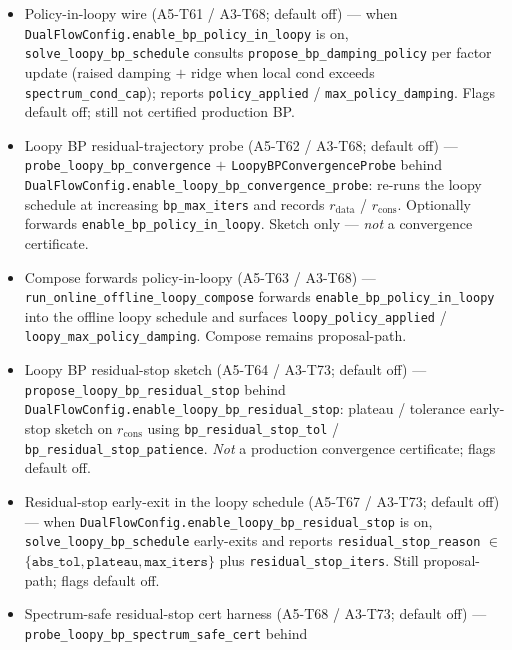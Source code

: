 \documentclass[11pt]{article}
\begin{document}
\begin{itemize}[leftmargin=1.5em]
  off) --- \texttt{run\_online\_offline\_loopy\_compose} behind
  \texttt{DualFlowConfig.enable\_online\_offline\_loopy\_compose}: live
  BMU tallies then offline loopy-BP schedule. Still proposal-path; not
  production online$\to$offline BP.
  \item Policy-in-loopy wire (A5-T61 / A3-T68; default off) --- when
  \texttt{DualFlowConfig.enable\_bp\_policy\_in\_loopy} is on,
  \texttt{solve\_loopy\_bp\_schedule} consults
  \texttt{propose\_bp\_damping\_policy} per factor update (raised damping $+$
  ridge when local cond exceeds \texttt{spectrum\_cond\_cap}); reports
  \texttt{policy\_applied} / \texttt{max\_policy\_damping}. Flags default
  off; still not certified production BP.
  \item Loopy BP residual-trajectory probe (A5-T62 / A3-T68; default off)
  --- \texttt{probe\_loopy\_bp\_convergence} $+$
  \texttt{LoopyBPConvergenceProbe} behind
  \texttt{DualFlowConfig.enable\_loopy\_bp\_convergence\_probe}: re-runs the
  loopy schedule at increasing \texttt{bp\_max\_iters} and records
  $r_{\mathrm{data}}$ / $r_{\mathrm{cons}}$. Optionally forwards
  \texttt{enable\_bp\_policy\_in\_loopy}. Sketch only --- \emph{not} a
  convergence certificate.
  \item Compose forwards policy-in-loopy (A5-T63 / A3-T68) ---
  \texttt{run\_online\_offline\_loopy\_compose} forwards
  \texttt{enable\_bp\_policy\_in\_loopy} into the offline loopy schedule and
  surfaces \texttt{loopy\_policy\_applied} /
  \texttt{loopy\_max\_policy\_damping}. Compose remains proposal-path.
  \item Loopy BP residual-stop sketch (A5-T64 / A3-T73; default off)
  --- \texttt{propose\_loopy\_bp\_residual\_stop} behind
  \texttt{DualFlowConfig.enable\_loopy\_bp\_residual\_stop}: plateau /
  tolerance early-stop sketch on $r_{\mathrm{cons}}$ using
  \texttt{bp\_residual\_stop\_tol} / \texttt{bp\_residual\_stop\_patience}.
  \emph{Not} a production convergence certificate; flags default off.
  \item Residual-stop early-exit in the loopy schedule (A5-T67 / A3-T73;
  default off) --- when
  \texttt{DualFlowConfig.enable\_loopy\_bp\_residual\_stop} is on,
  \texttt{solve\_loopy\_bp\_schedule} early-exits and reports
  \texttt{residual\_stop\_reason} $\in$
  $\{\texttt{abs\_tol},\texttt{plateau},\texttt{max\_iters}\}$ plus
  \texttt{residual\_stop\_iters}. Still proposal-path; flags default off.
  \item Spectrum-safe residual-stop cert harness (A5-T68 / A3-T73;
  default off) --- \texttt{probe\_loopy\_bp\_spectrum\_safe\_cert} behind

\end{itemize}
\end{document}
